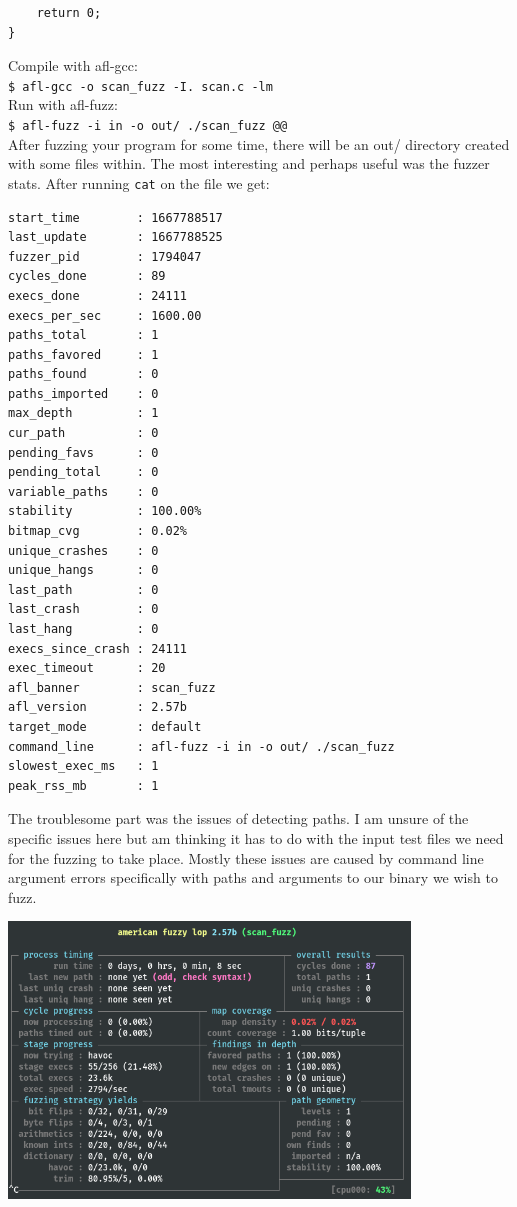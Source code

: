 \documentclass[12pt, letterpaper]{article}
\begin{document}
\begin{sloppypar}
\begin{flushleft}
\begin{lstlisting}
    return 0;
}
\end{lstlisting}

Compile with afl-gcc: \\
\verb|$ afl-gcc -o scan_fuzz -I. scan.c -lm| \\

Run with afl-fuzz: \\
\verb|$ afl-fuzz -i in -o out/ ./scan_fuzz @@| \\

After fuzzing your program for some time, there will be an out/ directory created with 
some files within. The most interesting and perhaps useful was the fuzzer stats. After 
running \verb|cat| on the file we get:

\begin{lstlisting}
start_time        : 1667788517
last_update       : 1667788525
fuzzer_pid        : 1794047
cycles_done       : 89
execs_done        : 24111
execs_per_sec     : 1600.00
paths_total       : 1
paths_favored     : 1
paths_found       : 0
paths_imported    : 0
max_depth         : 1
cur_path          : 0
pending_favs      : 0
pending_total     : 0
variable_paths    : 0
stability         : 100.00%
bitmap_cvg        : 0.02%
unique_crashes    : 0
unique_hangs      : 0
last_path         : 0
last_crash        : 0
last_hang         : 0
execs_since_crash : 24111
exec_timeout      : 20
afl_banner        : scan_fuzz
afl_version       : 2.57b
target_mode       : default
command_line      : afl-fuzz -i in -o out/ ./scan_fuzz
slowest_exec_ms   : 1
peak_rss_mb       : 1
\end{lstlisting}
The troublesome part was the issues of detecting paths. I am unsure of the specific issues 
here but am thinking it has to do with the input test files we need for the fuzzing to take 
place. Mostly these issues are caused by command line argument errors specifically with 
paths and arguments to our binary we wish to fuzz. 

\begin{center}
{\includegraphics[width=0.8\textwidth]{afl-fuzz.png}}
\end{center}


\end{flushleft}
\end{sloppypar}
\end{document}
